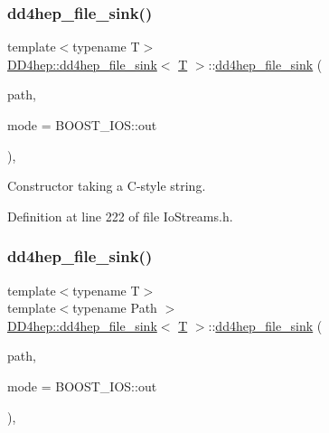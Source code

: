 \subsubsection{\texorpdfstring{dd4hep\+\_\+file\+\_\+sink()}{dd4hep\_file\_sink()}\hspace{0.1cm}{\footnotesize\ttfamily [5/6]}}
{\footnotesize\ttfamily template$<$typename T$>$ \\
\hyperlink{class_d_d4hep_1_1dd4hep__file__sink}{D\+D4hep\+::dd4hep\+\_\+file\+\_\+sink}$<$ \hyperlink{class_t}{T} $>$\+::\hyperlink{class_d_d4hep_1_1dd4hep__file__sink}{dd4hep\+\_\+file\+\_\+sink} (\begin{DoxyParamCaption}\item[{const char $\ast$}]{path,  }\item[{B\+O\+O\+S\+T\+\_\+\+I\+O\+S\+::openmode}]{mode = {\ttfamily BOOST\+\_\+IOS\+:\+:out} }\end{DoxyParamCaption})\hspace{0.3cm}{\ttfamily [inline]}, {\ttfamily [explicit]}}



Constructor taking a C-\/style string. 



Definition at line 222 of file Io\+Streams.\+h.

\hypertarget{class_d_d4hep_1_1dd4hep__file__sink_a29264d126bcd8d00a3cb2c8d597c4c16}{}\label{class_d_d4hep_1_1dd4hep__file__sink_a29264d126bcd8d00a3cb2c8d597c4c16} 
\subsubsection{\texorpdfstring{dd4hep\+\_\+file\+\_\+sink()}{dd4hep\_file\_sink()}\hspace{0.1cm}{\footnotesize\ttfamily [6/6]}}
{\footnotesize\ttfamily template$<$typename T$>$ \\
template$<$typename Path $>$ \\
\hyperlink{class_d_d4hep_1_1dd4hep__file__sink}{D\+D4hep\+::dd4hep\+\_\+file\+\_\+sink}$<$ \hyperlink{class_t}{T} $>$\+::\hyperlink{class_d_d4hep_1_1dd4hep__file__sink}{dd4hep\+\_\+file\+\_\+sink} (\begin{DoxyParamCaption}\item[{const \hyperlink{class_d_d4hep_1_1_path}{Path} \&}]{path,  }\item[{B\+O\+O\+S\+T\+\_\+\+I\+O\+S\+::openmode}]{mode = {\ttfamily BOOST\+\_\+IOS\+:\+:out} }\end{DoxyParamCaption})\hspace{0.3cm}{\ttfamily [inline]}, {\ttfamily [explicit]}}




